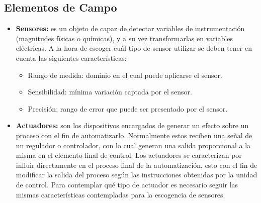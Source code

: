 \subsection{Elementos de Campo}
\begin{itemize}
\item \textbf{Sensores:}
es un objeto de capaz de detectar variables de instrumentación (magnitudes físicas o químicas), y a su vez transformarlas en variables eléctricas. A la hora de escoger cuál tipo de sensor utilizar se deben tener en cuenta las siguientes características:
\begin{itemize}
\item{Rango de medida:}
dominio en el cual puede aplicarse el sensor.
\item{Sensibilidad:}
mínima variación captada por el sensor.
\item{Precisión:}
rango de error que puede ser presentado por el sensor.
\end{itemize}
\item \textbf{Actuadores:}
son los dispositivos encargados de generar un efecto sobre un proceso con el fin de automatizarlo. Normalmente estos reciben una señal de un regulador o controlador, con lo cual generan una salida proporcional a la misma en el elemento final de control. Los actuadores se caracterizan por influir directamente en el proceso final de la automatización, esto con el fin de modificar la salida del proceso según las instrucciones obtenidas por la unidad de control. Para contemplar qué tipo de actuador es necesario seguir las mismas características contempladas para la escogencia de sensores.
\end{itemize}
